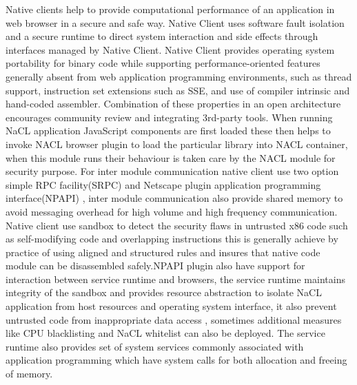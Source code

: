 \documentclass[23pt]{article}
\begin{document}
{\Large Native clients help to provide computational performance of an application in web browser in a secure and safe way. Native Client uses software fault isolation and a secure runtime to direct system interaction and side effects through interfaces managed by Native Client. Native Client provides operating system portability for binary code while supporting performance-oriented features generally absent from web application programming environments, such as thread support, instruction set extensions such as SSE, and use of compiler intrinsic and hand-coded assembler. Combination of these properties in an open architecture encourages community review and integrating 3rd-party tools. When running NaCL application JavaScript components are first loaded these then helps to invoke NACL browser plugin to load the particular library into NACL container, when this module runs their behaviour is taken care by the NACL module for security purpose. For inter module communication native client use two option simple RPC facility(SRPC) and Netscape plugin application programming interface(NPAPI) , inter module communication also provide shared memory to avoid messaging overhead for high volume and high frequency communication. Native client use sandbox to detect the security flaws in untrusted x86 code such as self-modifying code and overlapping instructions this is generally achieve by practice of using aligned and structured rules and insures that native code module can be disassembled safely.NPAPI plugin also have support for interaction between service runtime and browsers, the service runtime maintains integrity of the sandbox and provides resource abstraction to isolate NaCL application from host resources and operating system interface, it also prevent untrusted code from inappropriate data access , sometimes additional measures like CPU blacklisting and NaCL whitelist can also be deployed. The service runtime also provides set of system services commonly associated with application programming which have system calls for both allocation and freeing of  memory. \cite{naclback}  \\ \\
}
\end{document}
